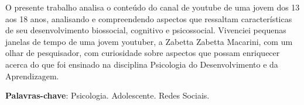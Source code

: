 
\setlength{\absparsep}{18pt} %
\begin{resumo}
 O presente trabalho analisa o conteúdo do canal de youtube de uma jovem dos 13 aos 18 anos, analisando e compreendendo aspectos que ressaltam características  de seu desenvolvimento biossocial, cognitivo e psicossocial. Vivenciei pequenas janelas de tempo de uma jovem youtuber, a Zabetta Zabetta Macarini, com um olhar de pesquisador, com curiosidade sobre aspectos que possam enriquecer acerca do que foi ensinado na disciplina Psicologia do Desenvolvimento e da Aprendizagem.

 \textbf{Palavras-chave}: Psicologia. Adolescente. Redes Sociais.
\end{resumo}
